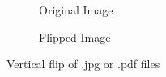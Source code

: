 \documentclass{article}
\begin{document}
\begin{figure}
   \begin{subfigure}[b]{.5\textwidth}
     \caption{Original Image}
   \end{subfigure}
   \begin{subfigure}[b]{.5\textwidth}
      \caption{Flipped Image}
   \end{subfigure}
\caption{Vertical flip of .jpg or .pdf files}
\end{figure}
\end{document}
